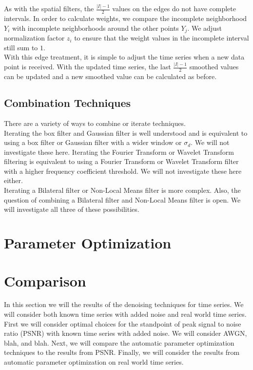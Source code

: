 \documentclass[11pt]{article}
\theoremstyle{definition}
\begin{document}
As with the spatial filters, the $\frac{\lvert I \rvert - 1}{2}$ values on the edges do not have complete intervals. In order to calculate weights, we compare the incomplete neighborhood $Y_i$ with incomplete neighborhoods around the other points $Y_j$. We adjust normalization factor $z_i$ to ensure that the weight values in the incomplete interval still sum to $1$.\\

With this edge treatment, it is simple to adjust the time series when a new data point is received. With the updated time series, the last $\frac{\lvert I \rvert - 1}{2}$ smoothed values can be updated and a new smoothed value can be calculated as before.

\newpage

\subsection{Combination Techniques}

There are a variety of ways to combine or iterate techniques.\\

Iterating the box filter and Gaussian filter is well understood and is equivalent to using a box filter or Gaussian filter with a wider window or $\sigma_d$. We will not investigate these here. Iterating the Fourier Transform or Wavelet Transform filtering is equivalent to using a Fourier Transform or Wavelet Transform filter with a higher frequency coefficient threshold. We will not investigate these here either.\\

Iterating a Bilateral filter or Non-Local Means filter is more complex. Also, the question of combining a Bilateral filter and Non-Local Means filter is open. We will investigate all three of these possibilities.


\section{Parameter Optimization}


\section{Comparison}

In this section we will the results of the denoising techniques for time series. We will consider both known time series with added noise and real world time series. First we will consider optimal choices for the standpoint of peak signal to noise ratio (PSNR) with known time series with added noise. We will consider AWGN, blah, and blah. Next, we will compare the automatic parameter optimization techniques to the results from PSNR. Finally, we will consider the results from automatic parameter optimization on real world time series.
\end{document}
